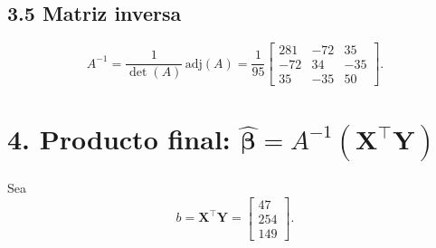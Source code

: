\documentclass[10pt,a4paper]{article}
\begin{document}
\subsection*{3.5 Matriz inversa}

\[
A^{-1}
= \frac{1}{\det(A)} \,\mathrm{adj}(A)
= \frac{1}{95}
\begin{bmatrix}
281 & -72 & 35\\
-72 & 34 & -35\\
35 & -35 & 50
\end{bmatrix}.
\]



\section*{4. Producto final: $\hat{\boldsymbol{\beta}} = A^{-1}(\mathbf{X}^\top \mathbf{Y})$}

Sea
\[
b
=
\mathbf{X}^\top \mathbf{Y}
=
\begin{bmatrix}
47\\
254\\
149
\end{bmatrix}.
\]
\end{document}
